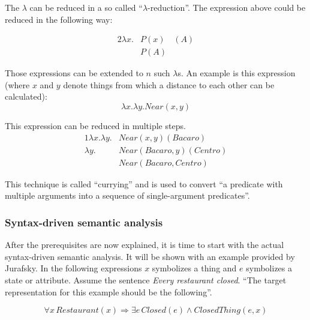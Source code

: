 \documentclass[12pt,twoside]{scrartcl}
\theoremstyle{plain}
\theoremstyle{definition}
\theoremstyle{remark}
\begin{document}
		The $\lambda$ can be reduced in a so called ``$\lambda$-reduction''\cite[p.~593]{Jurafsky2009a}. The expression above could be reduced in the following way:
		
		\begin{alignat*}{2}
			\lambda x.&P(x)&(A) \\
			&P(A)&
		\end{alignat*}
		
		Those expressions can be extended to $n$ such $\lambda$s. An example is this expression (where $x$ and $y$ denote things from which a distance to each other can be calculated):
		\[
			\lambda x.\lambda y.Near(x,y)
		\]
				
		This expression can be reduced in multiple steps.
		\begin{alignat*}{1}
			\lambda x.\lambda y.&Near(x,y)(Bacaro) \\
			\lambda y.&Near(Bacaro, y)(Centro) \\
			&Near(Bacaro, Centro)
		\end{alignat*}
				
		This technique is called ``currying''\cite[p.~594]{Jurafsky2009a} and is used to convert ``a predicate with multiple arguments into a sequence of single-argument predicates''\cite[p.~594]{Jurafsky2009a}.
		
		\subsubsection*{Syntax-driven semantic analysis}
		\label{subSubSec:syntaxDrivenSemanticAnalysis}
		
		After the prerequisites are now explained, it is time to start with the actual syntax-driven semantic analysis. It will be shown with an example provided by Jurafsky. In the following expressions $x$ symbolizes a thing and $e$ symbolizes a state or attribute. Assume the sentence \textit{Every restaurant closed}. ``The target representation for this example should be the following''\cite[p.~621]{Jurafsky2009}.
		
		\begin{equation}
		\label{eq:tarRep}
			\forall x \,Restaurant(x) \Rightarrow \exists e \,Closed(e) \wedge ClosedThing(e,x)
		\end{equation}
		
\end{document}
